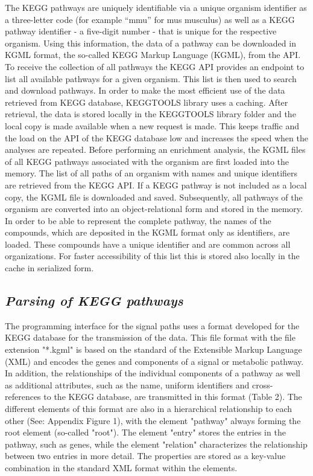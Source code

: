 \documentclass[11pt,a4paper]{article}
\begin{document}
The KEGG pathways are uniquely identifiable via a unique organism identifier as a
three-letter code (for example “mmu” for mus musculus) as well as a KEGG pathway
identifier - a five-digit number - that is unique for the respective organism.
Using this information, the data of a pathway can be downloaded in KGML format,
the so-called KEGG Markup Language (KGML), from the API. To receive the collection
of all pathways the KEGG API provides
an endpoint to list all available pathways for a given organism. This list is then
used to search and download pathways. In order to make the most efficient use of the
data retrieved from KEGG database, KEGGTOOLS library uses a caching. After retrieval,
the data is stored locally in the KEGGTOOLS library folder and the local copy is made
available when a new request is made. This keeps traffic and the load on the API of
the KEGG database low and increases the speed when the analyses are repeated.
Before performing an enrichment analysis, the KGML files of all KEGG pathways
associated with the organism are first loaded into the memory. The list of all
paths of an organism with names and unique identifiers are retrieved from the KEGG
API. If a KEGG pathway is not included as a local copy, the KGML file is downloaded
and saved. Subsequently, all pathways of the organism are converted into an object-relational
form and stored in the memory. In order to be able to represent the complete
pathway, the names of the compounds, which are deposited in the KGML format
only as identifiers, are loaded. These compounds have a unique identifier
and are common across all organizations. For faster accessibility of this list
this is stored also locally in the cache in serialized form.


\subsection*{\textit{Parsing of KEGG pathways}}

The programming interface for the signal paths uses a format developed for the KEGG
database for the transmission of the data.
This file format with the file extension "*.kgml" is based on the standard of the
Extensible Markup Language (XML) and encodes the genes and components of a signal
or metabolic pathway. In addition, the relationships of the individual components of
a pathway as well as additional attributes, such as the name, uniform identifiers and
cross-references to the KEGG database, are transmitted in this format (Table 2).
The different elements of this format are also in a hierarchical relationship to each
other (See: Appendix Figure 1), with the element "pathway" always forming the root
element (so-called "root"). The element "entry" stores the entries in the pathway,
such as genes, while the element "relation" characterizes the relationship between two
entries in more detail. The properties are stored as a key-value combination in the
standard XML format within the elements.
\end{document}
